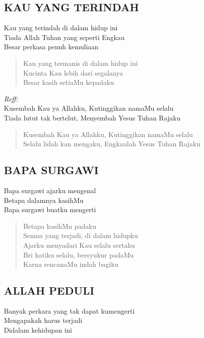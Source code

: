 \subsection{ KAU YANG TERINDAH}
\begin{altverse}
Kau yang terindah di dalam hidup ini\\
Tiada Allah Tuhan yang seperti Engkau\\
Besar perkasa penuh kemuliaan
\end{altverse}

\begin{verse}
Kau yang termanis di dalam hidup ini\\
Kucinta Kau lebih dari segalanya\\
Besar kasih setiaMu kepadaku
\end{verse}

\begin{altverse}
\textit{Reff:}\\
Kusembah Kau ya Allahku, Kutinggikan namaMu selalu\\
Tiada lutut tak bertelut, Menyembah Yesus Tuhan Rajaku
\end{altverse}

\begin{verse}
Kusembah Kau ya Allahku, Kutinggikan namaMu selalu\\
Selalu lidah kan mengaku, Engkaulah Yesus Tuhan Rajaku
\end{verse}

\subsection{ BAPA SURGAWI}
\begin{altverse}
Bapa surgawi ajarku mengenal\\
Betapa dalamnya kasihMu\\
Bapa surgawi buatku mengerti
\end{altverse}

\begin{verse}
Betapa kasihMu padaku\\
Semua yang terjadi, di dalam hidupku\\
Ajarku menyadari Kau selalu sertaku\\
Bri hatiku selalu, bersyukur padaMu\\
Karna rencanaMu indah bagiku
\end{verse}

\subsection{ ALLAH PEDULI}
\begin{altverse}
Banyak perkara yang tak dapat kumengerti\\
Mengapakah harus terjadi\\
Didalam kehidupan ini
\end{altverse}

